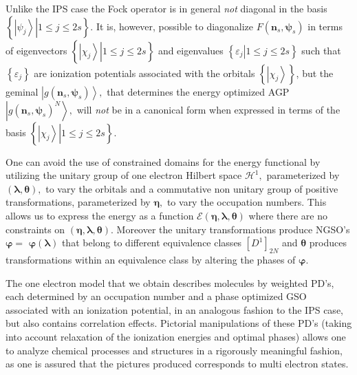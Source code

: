 \documentclass[aps,preprint]{revtex4}%
\begin{document}
Unlike the IPS case the Fock operator is in general \emph{not} diagonal in the
basis $\left\{  \left.  \left\vert \psi_{j}\right\rangle \right\vert 1\leq
j\leq2s\right\}  $. It is, however, possible to diagonalize $F\left(
\mathbf{n}_{s},\mathbf{\psi}_{s}\right)  $ in terms of eigenvectors $\left\{
\left.  \left\vert \chi_{j}\right\rangle \right\vert 1\leq j\leq2s\right\}  $
and eigenvalues $\left\{  \left.  \varepsilon_{j}\right\vert 1\leq
j\leq2s\right\}  $ such that $\left\{  \varepsilon_{j}\right\}  $ are
ionization potentials associated with the orbitals $\left\{  \left\vert
\chi_{j}\right\rangle \right\}  $, but the geminal $\left\vert g\left(
\mathbf{n}_{s},\mathbf{\psi}_{s}\right)  \right\rangle ,$ that determines the
energy optimized AGP\ $\left\vert g\left(  \mathbf{n}_{s},\mathbf{\psi}%
_{s}\right)  ^{N}\right\rangle ,$ will \emph{not }be in a canonical form when
expressed in terms of the basis $\left\{  \left.  \left\vert \chi
_{j}\right\rangle \right\vert 1\leq j\leq2s\right\}  .$

One can avoid the use of constrained domains for the energy functional by
utilizing the unitary group of one electron Hilbert space $\mathcal{H}^{1},$
parameterized by $\left(  \mathbf{\lambda},\mathbf{\theta}\right)  ,$ to vary
the orbitals and a commutative non unitary group of positive transformations,
parameterized by $\mathbf{\eta},$ to vary the occupation numbers. This allows
us to express the energy as a function $\mathcal{E}\left(  \mathbf{\eta
},\mathbf{\lambda},\mathbf{\theta}\right)  $ where there are no constraints on
$\left(  \mathbf{\eta},\mathbf{\lambda},\mathbf{\theta}\right)  .$ Moreover
the unitary transformations produce NGSO's $\mathbf{\varphi=}$
$\mathbf{\varphi}\left(  \mathbf{\lambda}\right)  $ that belong to different
equivalence classes $\left[  D^{1}\right]  _{2N}$ and $\mathbf{\theta}$
produces transformations within an equivalence class by altering the phases of
$\mathbf{\varphi.}$

The one electron model that we obtain describes molecules by weighted PD's,
each determined by an occupation number and a phase optimized GSO associated
with an ionization potential, in an analogous fashion to the IPS case, but
also contains correlation effects. Pictorial manipulations of these PD's
(taking into account relaxation of the ionization energies and optimal phases)
allows one to analyze chemical processes and structures in a rigorously
meaningful fashion, as one is assured that the pictures produced corresponds
to multi electron states.
\end{document}
